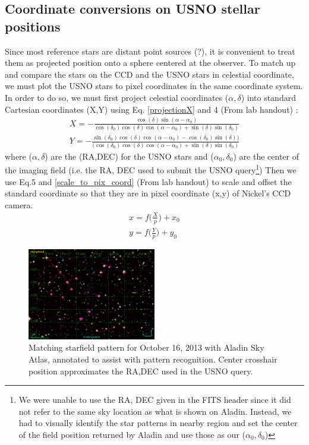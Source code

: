 \documentclass[authoryear, 12pt,5p, times]{elsarticle}
\begin{document}
\subsection{Coordinate conversions on USNO stellar positions}\label{usno_coord_conv}
Since most reference stars are distant point sources (?), it is convenient to treat them as projected position onto a sphere centered at the observer. To match up and compare the stars on the CCD and the USNO stars in celestial coordinate, we must plot the USNO stars to pixel coordinates in the same coordinate system. In order to do so, we must first project celestial coordinates ($\alpha,\delta $) into standard Cartesian coordinates (X,Y) using Eq. \ref{projectionX} and 4 (From lab handout) : 
\begin{align}
X = -\frac{\cos(\delta) \sin(\alpha-\alpha_0)}{\cos(\delta_0)\cos(\delta)\cos(\alpha-\alpha_0)+\sin(\delta) \sin(\delta_0)}
\\ Y= -\frac{\sin(\delta_0)\cos(\delta)\cos(\alpha-\alpha_0)-\cos(\delta_0)\sin(\delta))}{(\cos(\delta_0)\cos(\delta)\cos(\alpha-\alpha_0)+\sin(\delta)\sin(\delta_0)}
\label{projectionX}
\end{align}
where ($\alpha,\delta $) are the (RA,DEC) for the USNO stars and ($\alpha_0,\delta_0$) are the center of the imaging field (i.e. the RA, DEC used to submit the USNO query\footnote{We were unable to use the RA, DEC given in the FITS header since it did not refer to the same sky location as what is shown on Aladin. Instead, we had to visually identify the star patterns in nearby region and set the center of the field position returned by Aladin and use those as our ($\alpha_0,\delta_0$) })
Then we use Eq.5 and \ref{scale_to_pix_coord} (From lab handout) to scale and offset the standard coordinate so that they are in pixel coordinate (x,y)  of Nickel's CCD camera. 
\begin{align}
x  = f \Bigg(\frac{X}{p}\Bigg)+x_0
\\ y  = f \Bigg(\frac{Y}{p}\Bigg)+y_0
\label{scale_to_pix_coord}
\end{align}
\begin{figure}[h!]
\includegraphics[width=0.5\textwidth]{figures/aladin10162013}
\caption{ Matching starfield pattern for October 16, 2013 with Aladin Sky Atlas, annotated to assist with  pattern recognition. Center crosshair position approximates the RA,DEC used in the USNO query. }
\label{aladin10162013}
\end{figure}
\end{document}
